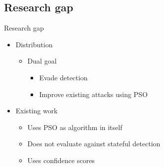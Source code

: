 \documentclass[11pt,t]{beamer}
\begin{document}

\subsection{Research gap}
\begin{frame}{Research gap}
\begin{itemize}	
	\item Distribution
	\begin{itemize}
		\item Dual goal
		\begin{itemize}
			\item Evade detection
			\item Improve existing attacks using PSO
		\end{itemize}
	\end{itemize}
	
	\item Existing work
	\begin{itemize}
		\item Uses PSO as algorithm in itself
		\item Does not evaluate against stateful detection 
		\item Uses confidence scores \cite{10.1007/978-3-030-59013-0_22, s20247158}
	\end{itemize}
\end{itemize}
\end{frame}
\end{document}
